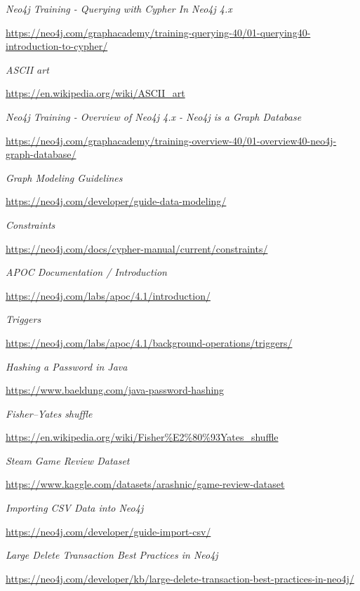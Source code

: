 \documentclass[12pt,a4paper]{report}
\begin{document}
\begin{thebibliography}{9}
  \textit{Neo4j Training - Querying with Cypher In Neo4j 4.x}
  
  \url{https://neo4j.com/graphacademy/training-querying-40/01-querying40-introduction-to-cypher/}
  
  
  \textit{ASCII art}
  
  \url{https://en.wikipedia.org/wiki/ASCII_art}
  
  
  \textit{Neo4j Training - Overview of Neo4j 4.x - Neo4j is a Graph Database  }
  
  \url{https://neo4j.com/graphacademy/training-overview-40/01-overview40-neo4j-graph-database/}
  
  
  \textit{Graph Modeling Guidelines}
  
  \url{https://neo4j.com/developer/guide-data-modeling/}
  
  
  \textit{Constraints}
  
  \url{https://neo4j.com/docs/cypher-manual/current/constraints/}
  
  
  \textit{APOC Documentation / Introduction}
  
  \url{https://neo4j.com/labs/apoc/4.1/introduction/}
  
  
  \textit{Triggers}
  
  \url{https://neo4j.com/labs/apoc/4.1/background-operations/triggers/}
  
  
  \textit{Hashing a Password in Java}
  
  \url{https://www.baeldung.com/java-password-hashing}
  
  
  \textit{Fisher–Yates shuffle}
  
  \url{https://en.wikipedia.org/wiki/Fisher%E2%80%93Yates_shuffle}
  
  
  \textit{Steam Game Review Dataset}
  
  \url{https://www.kaggle.com/datasets/arashnic/game-review-dataset}
  
  
  \textit{Importing CSV Data into Neo4j}
  
  \url{https://neo4j.com/developer/guide-import-csv/}
  
  
  \textit{Large Delete Transaction Best Practices in Neo4j}
  
  \url{https://neo4j.com/developer/kb/large-delete-transaction-best-practices-in-neo4j/}

\end{thebibliography}
\end{document}
